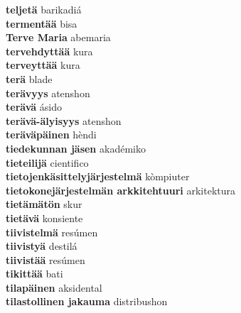 \textbf{ teljetä  } barikadiá \\
\textbf{ termentää  } bisa \\
\textbf{ Terve Maria  } abemaria \\
\textbf{ tervehdyttää  } kura \\
\textbf{ terveyttää  } kura \\
\textbf{ terä  } blade \\
\textbf{ terävyys  } atenshon \\
\textbf{ terävä  } ásido \\
\textbf{ terävä-älyisyys  } atenshon \\
\textbf{ teräväpäinen  } hèndi \\
\textbf{ tiedekunnan jäsen  } akadémiko \\
\textbf{ tieteilijä  } cientifico \\
\textbf{ tietojenkäsittelyjärjestelmä  } kòmpiuter \\
\textbf{ tietokonejärjestelmän arkkitehtuuri  } arkitektura \\
\textbf{ tietämätön  } skur \\
\textbf{ tietävä  } konsiente \\
\textbf{ tiivistelmä  } resúmen \\
\textbf{ tiivistyä  } destilá \\
\textbf{ tiivistää  } resúmen \\
\textbf{ tikittää  } bati \\
\textbf{ tilapäinen  } aksidental \\
\textbf{ tilastollinen jakauma  } distribushon \\
